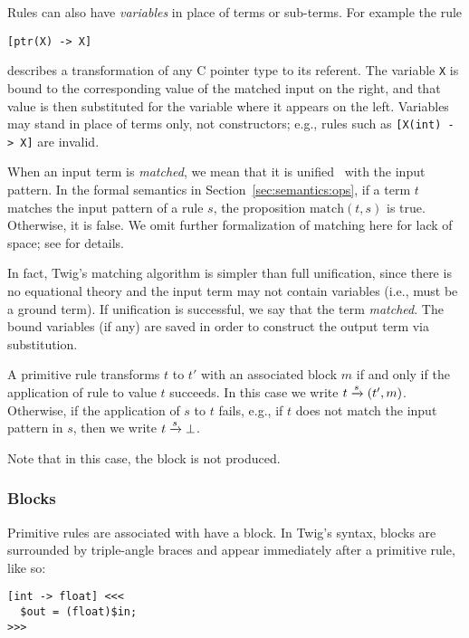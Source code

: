 Rules can also have \emph{variables} in place of terms or sub-terms. For example the rule

\begin{verbatim}
[ptr(X) -> X]
\end{verbatim}

describes a transformation of any C pointer type to its referent. The variable \texttt{X} is bound to the corresponding value of the matched input on the right, and that value is then substituted for the variable where it appears on the left. Variables may stand in place of terms only, not constructors; e.g., rules such as \texttt{[X(int)~->~X]} are invalid.

When an input term is \emph{matched}, we mean that it is unified~\cite{baader98rewriting} with the input pattern. In the formal semantics in Section~\ref{sec:semantics:ops}, if a term $t$ matches the input pattern of a rule $s$, the proposition $\mbox{match}(t,s)$ is true. Otherwise, it is false. We omit further formalization of matching here for lack of space; see \cite{baader98rewriting,system-s} for details.

In fact, Twig's matching algorithm is simpler than full unification, since there is no equational theory and the input term may not contain variables (i.e., must be a ground term). If unification is successful, we say that the term \emph{matched}. The bound variables (if any) are saved in order to construct the output term via substitution.

A primitive rule transforms $t$ to $t'$ with an associated block $m$ if and only if the application of rule to value $t$ succeeds. In this case we write $t \xrightarrow{s} (t',m)$. Otherwise, if the application of $s$ to $t$ fails, e.g., if $t$ does not match the input pattern in $s$, then we write $t \xrightarrow{s} \bot$.

Note that in this case, the block is not produced.


\subsubsection{Blocks}

Primitive rules are associated with have a block. In Twig's syntax, blocks are surrounded by triple-angle braces and appear immediately after a primitive rule, like so:

\begin{verbatim}
[int -> float] <<<
  $out = (float)$in;
>>>
\end{verbatim}

